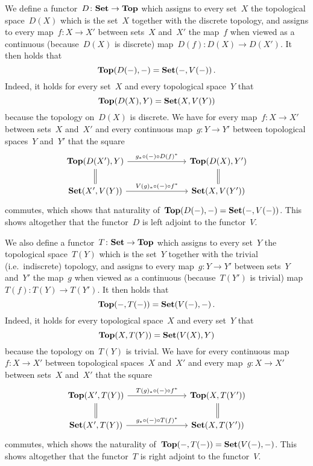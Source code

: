 We define a functor~$D \colon \mathbf{Set} \to \mathbf{Top}$ which assigns to every set~$X$ the topological space~$D(X)$ which is the set~$X$ together with the discrete topology, and assigns to every map~$f \colon X \to X'$ between sets~$X$ and~$X'$ the map~$f$ when viewed as a continuous (because~$D(X)$ is discrete) map~$D(f) \colon D(X) \to D(X')$.
It then holds that
\[
    \mathbf{Top}(D(-), -)
  = \mathbf{Set}(-,V(-)) \,.
\]
Indeed, it holds for every set~$X$ and every topological space~$Y$ that
\[
    \mathbf{Top}(D(X), Y)
  = \mathbf{Set}(X, V(Y))
\]
because the topology on~$D(X)$ is discrete.
We have for every map~$f \colon X \to X'$ between sets~$X$ and~$X'$ and every continuous map~$g \colon Y \to Y'$ between topological spaces~$Y$ and~$Y'$ that the square
\[
  \begin{tikzcd}[column sep = 7em]
      \Top(D(X'), Y)
      \arrow{r}[above]{g_* \circ (-) \circ D(f)^*}
      \arrow[equal]{d}
    & \Top(D(X), Y')
      \arrow[equal]{d}
    \\
      \Set(X', V(Y))
      \arrow{r}[above]{V(g)_* \circ (-) \circ f^*}
    & \Set(X, V(Y'))
  \end{tikzcd}
\]
commutes, which shows that naturality of~$\mathbf{Top}(D(-),-) = \mathbf{Set}(-,V(-))$.
This shows altogether that the functor~$D$ is left adjoint to the functor~$V$.

We also define a functor~$T \colon \mathbf{Set} \to \mathbf{Top}$ which assigns to every set~$Y$ the topological space~$T(Y)$ which is the set~$Y$ together with the trivial (i.e.\ indiscrete) topology, and assigns to every map~$g \colon Y \to Y'$ between sets~$Y$ and~$Y'$ the map~$g$ when viewed as a continuous (because~$T(Y')$ is trivial) map~$T(f) \colon T(Y) \to T(Y')$.
It then holds that
\[
    \mathbf{Top}(-, T(-))
  = \mathbf{Set}(V(-), -) \,.
\]
Indeed, it holds for every topological space~$X$ and every set~$Y$ that
\[
    \mathbf{Top}(X, T(Y))
  = \mathbf{Set}(V(X), Y)
\]
because the topology on~$T(Y)$ is trivial.
We have for every continuous map~$f \colon X \to X'$ between topological spaces~$X$ and~$X'$ and every map~$g \colon X \to X'$ between sets~$X$ and~$X'$ that the square
\[
  \begin{tikzcd}[column sep = 7em]
      \Top(X', T(Y))
      \arrow[equal]{d}
      \arrow{r}[above]{T(g)_* \circ (-) \circ f^*}
    & \Top(X, T(Y'))
      \arrow[equal]{d}
    \\
      \Set(X', T(Y))
      \arrow{r}[above]{g_* \circ (-) \circ T(f)^*}
    & \Set(X, T(Y'))
  \end{tikzcd}
\]
commutes, which shows the naturality of~$\mathbf{Top}(-,T(-)) = \mathbf{Set}(V(-),-)$.
This shows altogether that the functor~$T$ is right adjoint to the functor~$V$.




